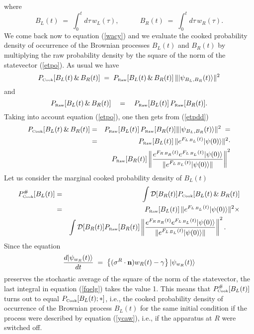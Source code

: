 \documentclass[10pt,a4paper]{article}
\begin{document}
where
\begin{equation}
B_{L}(t) \; = \; \int_{0}^{t}d\tau\, w_{L}(\tau), \qquad\quad
B_{R}(t) \; = \; \int_{0}^{t}d\tau\, w_{R}(\tau).
\end{equation}
We come back now to equation (\ref{wacy}) and we evaluate the
cooked probability density of occurrence of the Brownian processes
$B_{L}(t)$ and $B_{R}(t)$ by multiplying the raw probability
density by the square of the norm of the statevector (\ref{etpo}).
As usual we have
\begin{equation} \label{etpdd}
P_{\makebox{\tiny Cook}}[B_{L}(t)\,\&\, B_{R}(t)] \; = \;
P_{\makebox{\tiny Raw}}[B_{L}(t)\,\&\, B_{R}(t)]\, \|
|\psi_{B_{L}, B_{R}}(t)\rangle \|^{2}
\end{equation}
and
\begin{equation}
P_{\makebox{\tiny Raw}}[B_{L}(t)\,\&\, B_{R}(t)] \quad = \quad
P_{\makebox{\tiny Raw}}[B_{L}(t)]\, P_{\makebox{\tiny
Raw}}[B_{R}(t)].
\end{equation}
Taking into account equation (\ref{etpo}), one then gets from
(\ref{etpdd})
\begin{eqnarray}
P_{\makebox{\tiny Cook}}[B_{L}(t)\,\&\, B_{R}(t)] & = &
P_{\makebox{\tiny Raw}}[B_{L}(t)]\, P_{\makebox{\tiny
Raw}}[B_{R}(t)] \| |\psi_{B_{L}, B_{R}}(t)\rangle \|^{2} \; =
\nonumber \\ & = & P_{\makebox{\tiny Raw}}[B_{L}(t)]\, \|
e^{F_{L\, B_{L}}(t)}|\psi(0)\rangle \|^{2} \cdot \nonumber \\ & &
P_{\makebox{\tiny Raw}}[B_{R}(t)] \left\| \frac{ e^{F_{R\,
B_{R}}(t)} e^{F_{L\, B_{L}}(t)} |\psi(0)\rangle}{\| e^{F_{L\,
B_{L}}(t)}|\psi(0)\rangle\|} \right\|^{2}
\end{eqnarray}
Let us consider the marginal cooked probability density of
$B_{L}(t)$
\begin{eqnarray} \label{fqelg}
P^{\#}_{\makebox{\tiny Cook}}[B_{L}(t)] & = & \int {\mathcal
D}[B_{R}(t)]
P_{\makebox{\tiny Cook}}[B_{L}(t)\,\&\, B_{R}(t)] \nonumber \\
& = & P_{\makebox{\tiny Raw}}[B_{L}(t)]\, \| e^{F_{L\,
B_{L}}(t)}|\psi(0)\rangle \|^{2} \times \nonumber \\ & & \int
{\mathcal D}[B_{R}(t)] P_{\makebox{\tiny Raw}}[B_{R}(t)] \left\|
\frac{ e^{F_{R\, B_{R}}(t)} e^{F_{L\, B_{L}}(t)}
|\psi(0)\rangle}{\| e^{F_{L\, B_{L}}(t)}|\psi(0)\rangle\|}
\right\|^{2}. \qquad
\end{eqnarray}
Since the equation
\begin{equation}
\frac{d|\psi_{w_{R}}(t)\rangle}{dt} \; = \; \left\{ ({\bf
\sigma}^{R}\cdot {\bf n})w_{R}(t) - \gamma  \right\}
|\psi_{w_{R}}(t)\rangle
\end{equation}
preserves the stochastic average of the square of the norm of the
statevector, the last integral in equation (\ref{fqelg}) takes the
value 1. This means that $P^{\#}_{\makebox{\tiny Cook}}[B_{L}(t)]$
turns out to equal $P_{\makebox{\tiny Cook}}[B_{L}(t); *]$, i.e.,
the cooked probability density of occurrence of the Brownian
process $B_{L}(t)$ for the same initial condition if the process
were described by equation (\ref{ycaw}), i.e., if the apparatus at
$R$ were switched off.
\end{document}
